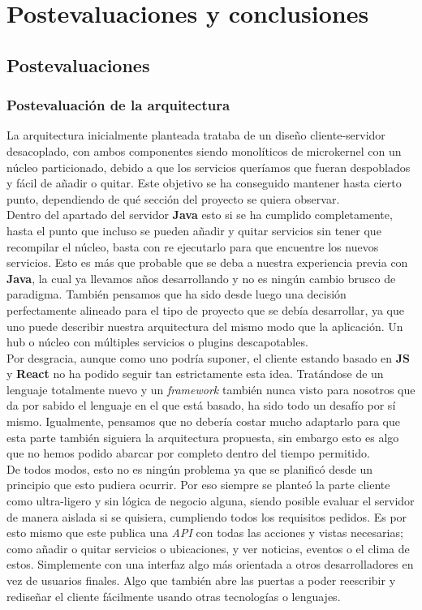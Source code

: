 \documentclass[../ei103948-project-documentation.tex]{subfiles}
\begin{document}
\section{Postevaluaciones y conclusiones}
    \subsection{Postevaluaciones}

        \subsubsection{Postevaluación de la arquitectura}
        La arquitectura inicialmente planteada trataba de un diseño cliente-servidor desacoplado, con ambos componentes siendo monolíticos de microkernel con un núcleo particionado, debido a que los servicios queríamos que fueran despoblados y fácil de añadir o quitar. Este objetivo se ha conseguido mantener hasta cierto punto, dependiendo de qué sección del proyecto se quiera observar.\\

        Dentro del apartado del servidor \textbf{Java} esto si se ha cumplido completamente, hasta el punto que incluso se pueden añadir y quitar servicios sin tener que recompilar el núcleo, basta con re ejecutarlo para que encuentre los nuevos servicios. Esto es más que probable que se deba a nuestra experiencia previa con \textbf{Java}, la cual ya llevamos años desarrollando y no es ningún cambio brusco de paradigma. También pensamos que ha sido desde luego una decisión perfectamente alineado para el tipo de proyecto que se debía desarrollar, ya que uno puede describir nuestra arquitectura del mismo modo que la aplicación. Un hub o núcleo con múltiples servicios o plugins descapotables.\\
        
        Por desgracia, aunque como uno podría suponer, el cliente estando basado en \textbf{JS} y \textbf{React} no ha podido seguir tan estrictamente esta idea. Tratándose de un lenguaje totalmente nuevo y un \textit{framework} también nunca visto para nosotros que da por sabido el lenguaje en el que está basado, ha sido todo un desafío por sí mismo. Igualmente, pensamos que no debería costar mucho adaptarlo para que esta parte también siguiera la arquitectura propuesta, sin embargo esto es algo que no hemos podido abarcar por completo dentro del tiempo permitido.\\
        
        De todos modos, esto no es ningún problema ya que se planificó desde un principio que esto pudiera ocurrir. Por eso siempre se planteó la parte cliente como ultra-ligero y sin lógica de negocio alguna, siendo posible evaluar el servidor de manera aislada si se quisiera, cumpliendo todos los requisitos pedidos. Es por esto mismo que este publica una \textit{API} con todas las acciones y vistas necesarias; como añadir o quitar servicios o ubicaciones, y ver noticias, eventos o el clima de estos. Simplemente con una interfaz algo más orientada a otros desarrolladores en vez de usuarios finales. Algo que también abre las puertas a poder reescribir y rediseñar el cliente fácilmente usando otras tecnologías o lenguajes.
\end{document}
